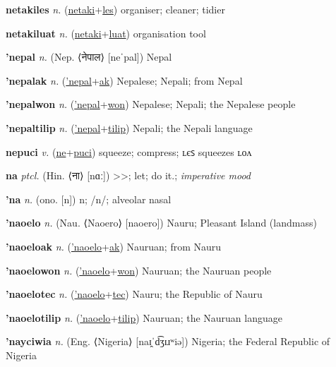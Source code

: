 \textbf{\hypertarget{netakiles}{netakiles}} \textit{n.} (\hyperlink{netaki}{netaki}+\allowbreak \hyperlink{les}{les})
organiser; cleaner; tidier

\textbf{\hypertarget{netakiluat}{netakiluat}} \textit{n.} (\hyperlink{netaki}{netaki}+\allowbreak \hyperlink{luat}{luat})
organisation tool

\textbf{\hypertarget{'nepal}{'nepal}} \textit{n.} (Nep. ⟨{\devanagari{}नेपाल}⟩ [neˈpal])
Nepal

\textbf{\hypertarget{'nepalak}{'nepalak}} \textit{n.} (\hyperlink{'nepal}{'nepal}+\allowbreak \hyperlink{ak}{ak})
Nepalese; Nepali; from Nepal

\textbf{\hypertarget{'nepalwon}{'nepalwon}} \textit{n.} (\hyperlink{'nepal}{'nepal}+\allowbreak \hyperlink{won}{won})
Nepalese; Nepali; the Nepalese people

\textbf{\hypertarget{'nepaltilip}{'nepaltilip}} \textit{n.} (\hyperlink{'nepal}{'nepal}+\allowbreak \hyperlink{tilip}{tilip})
Nepali; the Nepali language

\textbf{\hypertarget{nepuci}{nepuci}} \textit{v.} (\hyperlink{ne}{ne}+\allowbreak \hyperlink{puci}{puci})
squeeze; compress; ʟєꜱ squeezes ʟᴏᴧ

\textbf{\hypertarget{na}{na}} \textit{ptcl.} (Hin. ⟨{\devanagari{}ना}⟩ [nɑː])
>>; let; do it.; \textit{imperative mood}

\textbf{\hypertarget{'na}{'na}} \textit{n.} (ono. [n])
n; /n/; alveolar nasal

\textbf{\hypertarget{'naoelo}{'naoelo}} \textit{n.} (Nau. ⟨Naoero⟩ [naoero])
Nauru; Pleasant Island (landmass)

\textbf{\hypertarget{'naoeloak}{'naoeloak}} \textit{n.} (\hyperlink{'naoelo}{'naoelo}+\allowbreak \hyperlink{ak}{ak})
Nauruan; from Nauru

\textbf{\hypertarget{'naoelowon}{'naoelowon}} \textit{n.} (\hyperlink{'naoelo}{'naoelo}+\allowbreak \hyperlink{won}{won})
Nauruan; the Nauruan people

\textbf{\hypertarget{'naoelotec}{'naoelotec}} \textit{n.} (\hyperlink{'naoelo}{'naoelo}+\allowbreak \hyperlink{tec}{tec})
Nauru; the Republic of Nauru

\textbf{\hypertarget{'naoelotilip}{'naoelotilip}} \textit{n.} (\hyperlink{'naoelo}{'naoelo}+\allowbreak \hyperlink{tilip}{tilip})
Nauruan; the Nauruan language

\textbf{\hypertarget{'nayciwia}{'nayciwia}} \textit{n.} (Eng. ⟨Nigeria⟩ [naɪ̯ˈd͡ʒɪɹʷiə])
Nigeria; the Federal Republic of Nigeria

